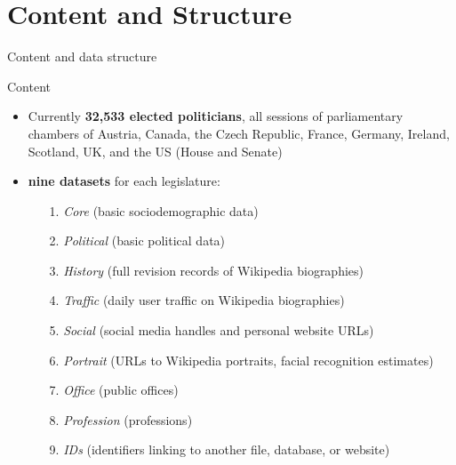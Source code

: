 \section{Content and Structure}
\begin{frame}{Content and data structure}
\begin{block}{Content}
\begin{itemize}
	\item Currently \textbf{32,533 elected politicians}, all sessions of parliamentary chambers of Austria, Canada, the Czech Republic, France, Germany, Ireland, Scotland, UK, and the US (House and Senate)
	\pause
	\item \textbf{nine datasets} for each legislature:
	\item[] \begin{itemize}
			  \item[1.] \textit{Core} (basic sociodemographic data)
			  \item[2.] \textit{Political} (basic political data)	  
			  \item[3.] \textit{History} (full revision records of Wikipedia biographies)
			  \item[4.] \textit{Traffic} (daily user traffic on Wikipedia biographies)
			  \item[5.] \textit{Social} (social media handles and personal website URLs)
			  \item[6.] \textit{Portrait} (URLs to Wikipedia portraits, facial recognition estimates)
			  \item[7.] \textit{Office} (public offices)
			  \item[8.] \textit{Profession} (professions)
			  \item[9.] \textit{IDs} (identifiers linking to another file, database, or website)
		\end{itemize}
\end{itemize}
\end{block}
\end{frame}


